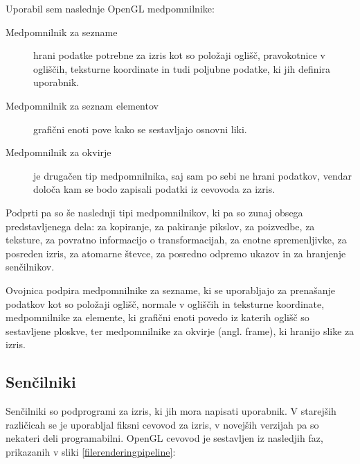 \documentclass[a4paper, 12pt]{book}
\begin{document}
Uporabil sem naslednje OpenGL medpomnilnike:
\begin{description}

\item [Medpomnilnik za sezname] hrani podatke potrebne za izris kot so položaji oglišč, pravokotnice v ogliščih, teksturne koordinate in tudi poljubne podatke, ki jih definira uporabnik.

\item [Medpomnilnik za seznam elementov] grafični enoti pove kako se sestavljajo osnovni liki.

\item [Medpomnilnik za okvirje] je drugačen tip medpomnilnika, saj sam po sebi ne hrani podatkov, vendar določa kam se bodo zapisali podatki iz cevovoda za izris.

\end{description}
Podprti pa so še naslednji tipi medpomnilnikov, ki pa so zunaj obsega predstavljenega dela: za kopiranje, za pakiranje pikslov, za poizvedbe, za teksture, za povratno informacijo o transformacijah, za enotne spremenljivke, za posreden izris, za atomarne števce, za posredno odpremo ukazov in za hranjenje senčilnikov.


Ovojnica podpira medpomnilnike za sezname, ki se uporabljajo za prenašanje podatkov kot so položaji oglišč, normale v ogliščih in teksturne koordinate, medpomnilnike za elemente, ki grafični enoti povedo iz katerih oglišč so sestavljene ploskve, ter medpomnilnike za okvirje (angl. frame), ki hranijo slike za izris.

\subsection*{Senčilniki}

Senčilniki so podprogrami za izris, ki jih mora napisati uporabnik. V starejših različicah se je uporabljal fiksni cevovod za izris, v novejših verzijah pa so nekateri deli programabilni. OpenGL cevovod je sestavljen iz nasledjih faz, prikazanih v sliki \ref{filerenderingpipeline}:
\end{document}
